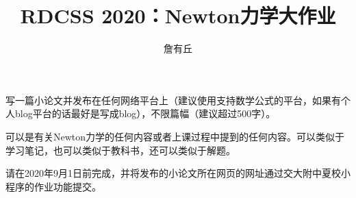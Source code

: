 \documentclass{article}
\title{RDCSS 2020：Newton力学大作业}
\author{詹有丘}
\begin{document}
\maketitle

写一篇小论文并发布在任何网络平台上（建议使用支持数学公式的平台，如果有个人blog平台的话最好是写成blog），不限篇幅（建议超过500字）。

可以是有关Newton力学的任何内容或者上课过程中提到的任何内容。可以类似于学习笔记，也可以类似于教科书，还可以类似于解题。

请在2020年9月1日前完成，并将发布的小论文所在网页的网址通过交大附中夏校小程序的作业功能提交。
\end{document}
